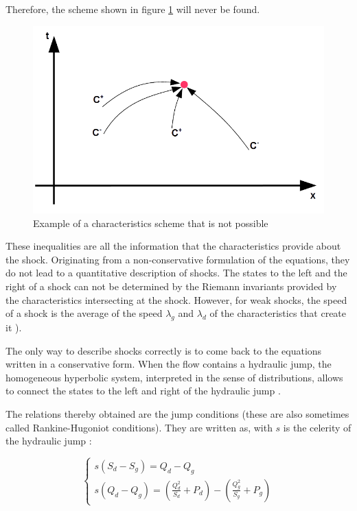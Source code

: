Therefore, the scheme shown in figure \ref{fig:Timp} will never be found.

\begin{figure}[H]
 \begin{center}
  \includegraphics[width=\textwidth]{Figures/Trajec_imposs.png}
  \caption{Example of a characteristics scheme that is not possible}
  \label{fig:Timp}
 \end{center}
\end{figure}

These inequalities are all the information that the characteristics provide about the shock. Originating from a non-conservative formulation of the equations, they do not lead to a quantitative description of shocks. The states to the left and the right of a shock can not be determined by the Riemann invariants provided by the characteristics intersecting at the shock. However, for weak shocks, the speed of a shock is the average of the speed $\lambda_g$ and $\lambda_d$ of the characteristics that create it \cite{SMOLLER83}\cite{LAX72}).

The only way to describe shocks correctly is to come back to the equations written in a conservative form. When the flow contains a hydraulic jump, the homogeneous hyperbolic system, interpreted in the sense of distributions, allows to connect the states to the left and right of the hydraulic jump \cite{GODLEWSKI91}.

The relations thereby obtained are the jump conditions (these are also sometimes called Rankine-Hugoniot conditions). They are written as, with $s$ is the celerity of the hydraulic jump :

\begin{equation}
   \left \lbrace
  \begin{array}{l}
   s ( S_d -S_g ) = Q_d - Q_g \\
   s ( Q_d - Q_g ) = \left ( \frac{Q_{d}^2}{S_d} + P_d \right ) - \left ( \frac{Q_{g}^2}{S_g} + P_g \right )
  \end{array}
 \right.
\end{equation}

